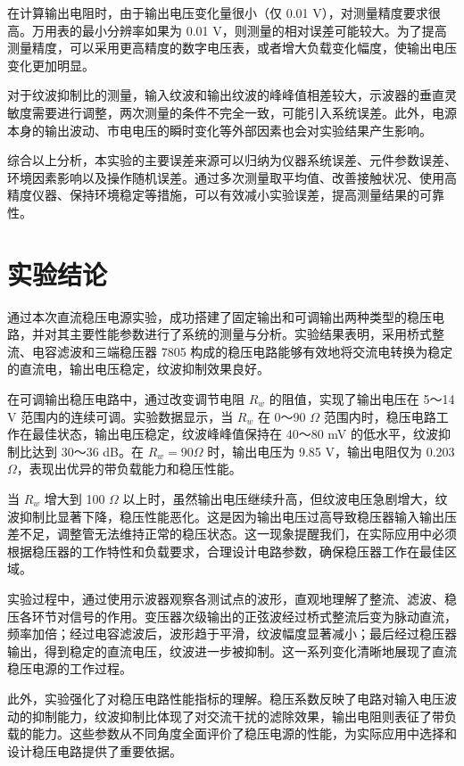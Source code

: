 ﻿\documentclass[12pt,a4paper]{article}
\begin{document}
在计算输出电阻时，由于输出电压变化量很小（仅 0.01 V），对测量精度要求很高。万用表的最小分辨率如果为 0.01 V，则测量的相对误差可能较大。为了提高测量精度，可以采用更高精度的数字电压表，或者增大负载变化幅度，使输出电压变化更加明显。

对于纹波抑制比的测量，输入纹波和输出纹波的峰峰值相差较大，示波器的垂直灵敏度需要进行调整，两次测量的条件不完全一致，可能引入系统误差。此外，电源本身的输出波动、市电电压的瞬时变化等外部因素也会对实验结果产生影响。

综合以上分析，本实验的主要误差来源可以归纳为仪器系统误差、元件参数误差、环境因素影响以及操作随机误差。通过多次测量取平均值、改善接触状况、使用高精度仪器、保持环境稳定等措施，可以有效减小实验误差，提高测量结果的可靠性。

\section{实验结论}

通过本次直流稳压电源实验，成功搭建了固定输出和可调输出两种类型的稳压电路，并对其主要性能参数进行了系统的测量与分析。实验结果表明，采用桥式整流、电容滤波和三端稳压器 7805 构成的稳压电路能够有效地将交流电转换为稳定的直流电，输出电压稳定，纹波抑制效果良好。

在可调输出稳压电路中，通过改变调节电阻 $R_w$ 的阻值，实现了输出电压在 5～14 V 范围内的连续可调。实验数据显示，当 $R_w$ 在 0～90 $\Omega$ 范围内时，稳压电路工作在最佳状态，输出电压稳定，纹波峰峰值保持在 40～80 mV 的低水平，纹波抑制比达到 30～36 dB。在 $R_w = 90 \Omega$ 时，输出电压为 9.85 V，输出电阻仅为 0.203 $\Omega$，表现出优异的带负载能力和稳压性能。

当 $R_w$ 增大到 100 $\Omega$ 以上时，虽然输出电压继续升高，但纹波电压急剧增大，纹波抑制比显著下降，稳压性能恶化。这是因为输出电压过高导致稳压器输入输出压差不足，调整管无法维持正常的稳压状态。这一现象提醒我们，在实际应用中必须根据稳压器的工作特性和负载要求，合理设计电路参数，确保稳压器工作在最佳区域。

实验过程中，通过使用示波器观察各测试点的波形，直观地理解了整流、滤波、稳压各环节对信号的作用。变压器次级输出的正弦波经过桥式整流后变为脉动直流，频率加倍；经过电容滤波后，波形趋于平滑，纹波幅度显著减小；最后经过稳压器输出，得到稳定的直流电压，纹波进一步被抑制。这一系列变化清晰地展现了直流稳压电源的工作过程。

此外，实验强化了对稳压电路性能指标的理解。稳压系数反映了电路对输入电压波动的抑制能力，纹波抑制比体现了对交流干扰的滤除效果，输出电阻则表征了带负载的能力。这些参数从不同角度全面评价了稳压电源的性能，为实际应用中选择和设计稳压电路提供了重要依据。
\end{document}
